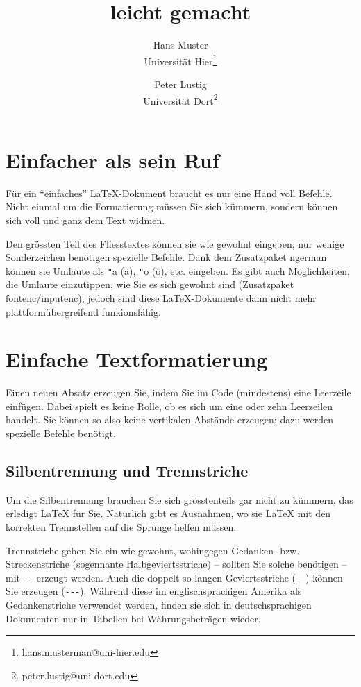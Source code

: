 \documentclass[11pt, a4paper]{article}
\title{\ltx{} leicht gemacht}
\author{Hans Muster\\ Universität Hier\thanks{hans.musterman@uni-hier.edu} \and Peter Lustig\\Universität Dort\thanks{peter.lustig@uni-dort.edu}}
\newcommand{\ltx}{\LaTeX}
\begin{document}
\maketitle
\tableofcontents
\newpage

\section{Einfacher als sein Ruf}

Für ein \enquote{einfaches} \ltx-Dokument braucht es nur eine Hand voll Befehle. Nicht einmal um die Formatierung müssen Sie sich kümmern, sondern können sich voll und ganz dem Text widmen.

Den grössten Teil des Fliesstextes können sie wie gewohnt eingeben, nur wenige Sonderzeichen benötigen spezielle Befehle. Dank dem Zusatzpaket ngerman können sie Umlaute als \verb+"+a (ä), \verb+"+o (ö), etc. eingeben. Es gibt auch Möglichkeiten, die Umlaute einzutippen, wie Sie es sich gewohnt sind (Zusatzpaket fontenc/inputenc), jedoch sind diese \ltx-Dokumente dann nicht mehr plattformübergreifend funkionsfähig.

\section{Einfache Textformatierung}

Einen neuen Absatz erzeugen Sie, indem Sie im Code (mindestens) eine Leerzeile einfügen. Dabei spielt es keine Rolle, ob es sich um eine oder zehn Leerzeilen handelt. Sie können so also keine vertikalen Abstände erzeugen; dazu werden spezielle Befehle benötigt.

\subsection{Silbentrennung und Trennstriche}

Um die Silbentrennung brauchen Sie sich grösstenteils gar nicht zu kümmern, das erledigt \ltx{} für Sie. Natürlich gibt es Ausnahmen, wo sie \ltx{} mit den korrekten Trennstellen auf die Sprünge helfen müssen.

Trennstriche geben Sie ein wie gewohnt, wohingegen Gedanken- bzw. Streckenstriche (sogennante Halbgeviertsstriche) -- sollten Sie solche benötigen -- mit \verb+--+ erzeugt werden. Auch die doppelt so langen Geviertsstriche (---) können Sie erzeugen (\verb+---+). Während diese im englischsprachigen Amerika als Gedankenstriche verwendet werden, finden sie sich in deutschsprachigen Dokumenten nur in Tabellen bei Währungsbeträgen wieder.
\end{document}
